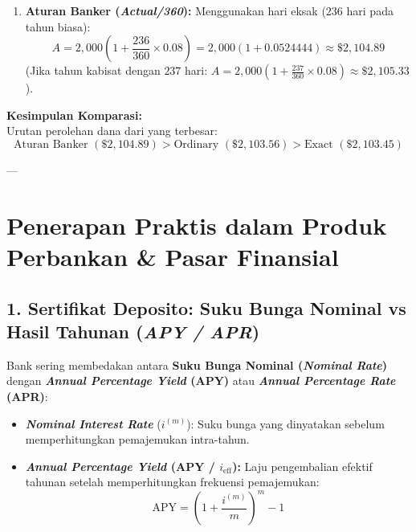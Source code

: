 \documentclass[11pt,a4paper]{article}
\begin{document}
\begin{examplebox}
\begin{enumerate}[label=(\alph*)]
    \item \textbf{Aturan Banker (\textit{Actual/360}):}
    Menggunakan hari eksak ($236$ hari pada tahun biasa):
    \begin{equation*}
        A = 2{,}000 \left( 1 + \frac{236}{360} \times 0.08 \right) = 2{,}000 (1 + 0.0524444) \approx \$2{,}104.89
    \end{equation*}
    (Jika tahun kabisat dengan $237$ hari: $A = 2{,}000 \left( 1 + \frac{237}{360} \times 0.08 \right) \approx \$2{,}105.33$).
\end{enumerate}

\textbf{Kesimpulan Komparasi:}\\
Urutan perolehan dana dari yang terbesar:
\begin{equation*}
    \text{Aturan Banker } (\$2{,}104.89) > \text{Ordinary } (\$2{,}103.56) > \text{Exact } (\$2{,}103.45)
\end{equation*}
\end{examplebox}

---

\section{Penerapan Praktis dalam Produk Perbankan \& Pasar Finansial}

\subsection{1. Sertifikat Deposito: Suku Bunga Nominal vs Hasil Tahunan (\textit{APY / APR})}

Bank sering membedakan antara \textbf{Suku Bunga Nominal (\textit{Nominal Rate})} dengan \textbf{\textit{Annual Percentage Yield} (APY)} atau \textbf{\textit{Annual Percentage Rate} (APR)}:
\begin{itemize}[leftmargin=1.5em]
    \item \textbf{\textit{Nominal Interest Rate}} ($i^{(m)}$): Suku bunga yang dinyatakan sebelum memperhitungkan pemajemukan intra-tahun.
    \item \textbf{\textit{Annual Percentage Yield} (APY / $i_{\text{eff}}$):} Laju pengembalian efektif tahunan setelah memperhitungkan frekuensi pemajemukan:
    \begin{equation}
        \text{APY} = \left( 1 + \frac{i^{(m)}}{m} \right)^m - 1
    \end{equation}
\end{itemize}
\end{document}
